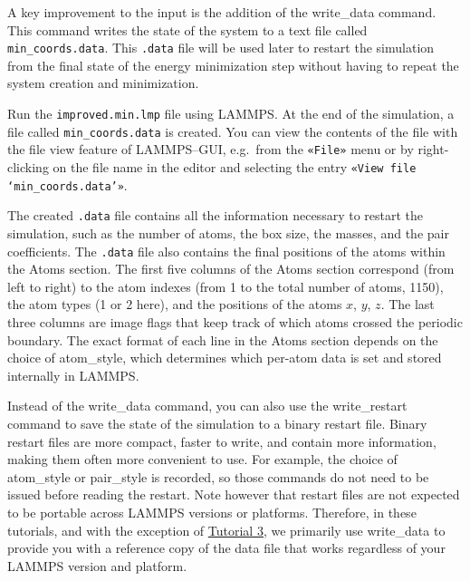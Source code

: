 \documentclass[9pt,tutorial]{livecoms}
\newcommand{\lmpcmd}[1]{\hspace{0pt}\colorbox{listing}{\textcolor{command}{\small{#1}}}\hspace{0pt}} %
\newcommand{\lmpcmdnote}[1]{\hspace{0pt}\colorbox{note_listing}{\textcolor{command}{\small{#1}}}\hspace{0pt}} %
\newcommand{\flecmd}[1]{\textcolor{command}{\texttt{#1}}} %
\newcommand{\guicmd}[1]{\textcolor{command}{\texttt{«#1»}}} %
\begin{document}
A key improvement to the input is the addition of the
\lmpcmd{write\_data} command.  This command writes the state
of the system to a text file called \flecmd{min\_coords.data}.
This \flecmd{.data} file will be used later
to restart the simulation from the final state of the energy
minimization step without having to repeat the system creation and
minimization.

Run the \flecmd{improved.min.lmp} file using LAMMPS.  At the end of the simulation, a file
called \flecmd{min\_coords.data} is created.  You can view the contents
of the file with the file view feature of LAMMPS--GUI, e.g.~from the
\guicmd{File} menu or by right-clicking on the file name in the editor
and selecting the entry \guicmd{View file `min\_coords.data'}.

The created \flecmd{.data} file contains all the information necessary to
restart the simulation, such as the number of atoms, the box size, the
masses, and the pair coefficients.  The
\flecmd{.data} file also contains the final
positions of the atoms within the \lmpcmd{Atoms} section.  The first five
columns of the \lmpcmd{Atoms} section correspond (from left to right) to
the atom indexes (from 1 to the total number of atoms, 1150), the atom
types (1 or 2 here), and the positions of the atoms $x$, $y$, $z$.  The
last three columns are image flags that keep track of which atoms
crossed the periodic boundary.  The exact format of each line in the
\lmpcmd{Atoms} section depends on the choice of \lmpcmd{atom\_style}, which
determines which per-atom data is set and stored internally in LAMMPS.

\begin{note}
Instead of the \lmpcmdnote{write\_data} command, you can also use the
\lmpcmdnote{write\_restart} command to save the state
of the simulation to a binary restart file.  Binary restart files are
more compact, faster to write, and contain more information, making them often
more convenient to use.  For example, the choice of \lmpcmdnote{atom\_style}
or \lmpcmdnote{pair\_style} is recorded, so those commands do not need to be issued
before reading the restart.  Note however that restart files are not expected to be
portable across LAMMPS versions or platforms.  Therefore, in these tutorials,
and with the exception of \hyperref[all-atom-label]{Tutorial 3}, we primarily use \lmpcmdnote{write\_data} to provide you with a reference
copy of the data file that works regardless of your LAMMPS version and platform.
\end{note}
\end{document}
